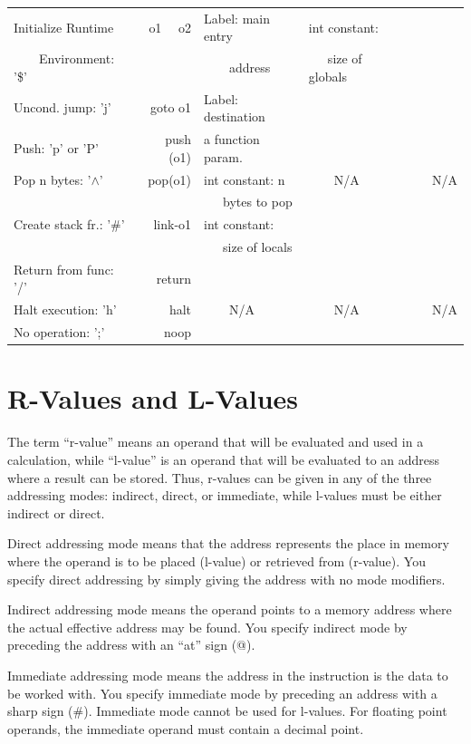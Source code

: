 \documentclass[12pt]{article}
\begin{document}
\begin{tabular}{ | l r | l | l | l | }
    Initialize Runtime & o1 \ \ o2 & Label: main entry& int constant:  & \\
       \ \ \ \ Environment: '\$' &  &  \ \ \ \ address & \ \ \ size of globals & \\
    \hline
    Uncond. jump: 'j' & goto o1 & Label: destination & & \\
    Push: 'p' or 'P' & push (o1) & a function param. & & \\
    Pop n bytes: '$\wedge$' & pop(o1)& int constant:  n &{\large \ \ \ \ N/A} &{\large \ \ \ \ N/A} \\
    & & \ \ \ bytes to pop & & \\
    Create stack fr.: '\#' & link-o1& int constant: & & \\
       &  & \ \ \ size of locals & & \\
     \hline
     Return from func: '/' & return & & & \\
     Halt execution: 'h' & halt & {\large \ \ \ \ N/A} & {\large \ \ \ \ N/A} & {\large \ \ \ \ N/A} \\
     No operation: ';' & noop & & & \\
     \hline
  \end{tabular}
  \newpage
\section*{R-Values and L-Values}
     The term ``r-value'' means an operand that will be evaluated and used in a calculation, while ``l-value'' is an
operand that will be evaluated to an address where a result can be stored. Thus, r-values can be given in any
of the three addressing modes: indirect, direct, or immediate, while l-values must be either indirect or direct.

Direct addressing mode means that the address represents the place in memory where the operand is to be
placed (l-value) or retrieved from (r-value). You specify direct addressing by simply giving the address with no
mode modifiers.

Indirect addressing mode means the operand points to a memory address where the actual effective address
may be found. You specify indirect mode by preceding the address with an ``at'' sign (@).

Immediate addressing mode means the address in the instruction is the data to be worked with. You specify
immediate mode by preceding an address with a sharp sign (\#). Immediate mode cannot be used for l-values.
For floating point operands, the immediate operand must contain a decimal point.
\end{document}
